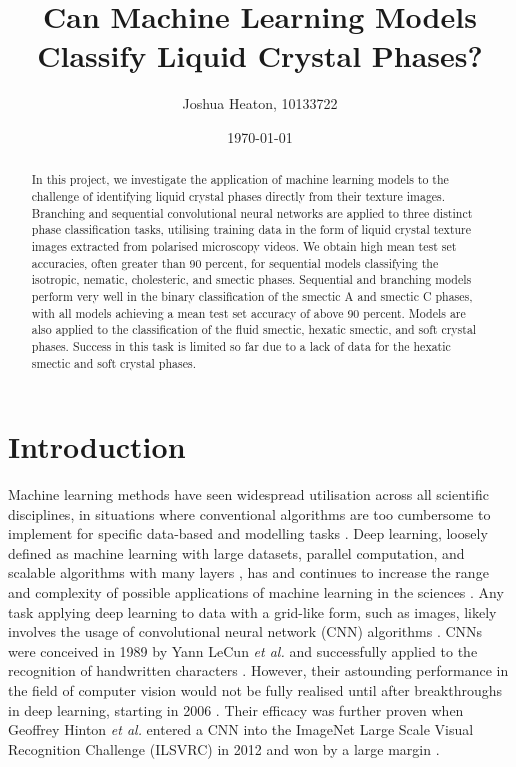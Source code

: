 \documentclass[12pt]{article}
\begin{document}
\title{Can Machine Learning Models Classify Liquid Crystal Phases?}
\author{Joshua Heaton, 10133722}
\date{\today}

\maketitle

\begin{abstract}
In this project, we investigate the application of machine learning models to the challenge of identifying liquid crystal phases directly from their texture images. Branching and sequential convolutional neural networks are applied to three distinct phase classification tasks, utilising training data in the form of liquid crystal texture images extracted from polarised microscopy videos. We obtain high mean test set accuracies, often greater than 90 percent, for sequential models classifying the isotropic, nematic, cholesteric, and smectic phases. Sequential and branching models perform very well in the binary classification of the smectic A and smectic C phases, with all models achieving a mean test set accuracy of above 90 percent. Models are also applied to the classification of the fluid smectic, hexatic smectic, and soft crystal phases. Success in this task is limited so far due to a lack of data for the hexatic smectic and soft crystal phases.
\end{abstract}

\newpage
\tableofcontents

\newpage
{}

\section{Introduction}
Machine learning methods have seen widespread utilisation across all scientific disciplines, in situations where conventional algorithms are too cumbersome to implement for specific data-based and modelling tasks \cite{Carleo19}. Deep learning, loosely defined as machine learning with large datasets, parallel computation, and scalable algorithms with many layers \cite{Goodfellow16}, has and continues to increase the range and complexity of possible applications of machine learning in the sciences \cite{Carleo19}. Any task applying deep learning to data with a grid-like form, such as images, likely involves the usage of convolutional neural network (CNN) algorithms \cite{Goodfellow16}. CNNs were conceived in 1989 by Yann LeCun \textit{et al.} and successfully applied to the recognition of handwritten characters \cite{LeCun89}. However, their astounding performance in the field of computer vision would not be fully realised until after breakthroughs in deep learning, starting in 2006 \cite{Goodfellow16}. Their efficacy was further proven when Geoffrey Hinton \textit{et al.} entered a CNN into the ImageNet Large Scale Visual Recognition Challenge (ILSVRC) in 2012 and won by a large margin \cite{ILSVRC15}.
\end{document}
